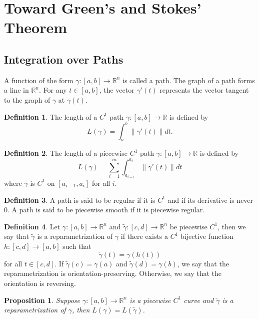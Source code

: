 \documentclass{article}
\theoremstyle{plain}
\newtheorem{proposition}[theorem]{Proposition}
\theoremstyle{definition}
\newtheorem*{definition}{Definition}
\newcommand{\R}{\mathbb{R}}
\newcommand{\norm}[1]{\left\lVert#1 \right\rVert}
\begin{document}
\section{Toward Green's and Stokes' Theorem}

\subsection{Integration over Paths}

A function of the form $\gamma : [a,b] \to \R^n$ is called a path. The graph of a path forms a line in $\R^n$. For any $t \in [a,b]$, the vector $\gamma'(t)$ represents the vector tangent to the graph of $\gamma$ at $\gamma(t)$.

\begin{definition}
    The length of a $C^1$ path $\gamma : [a,b] \to \R$ is defined by
    $$L(\gamma) = \int_{a}^{b}\norm{\gamma'(t)}dt.$$
\end{definition}

\begin{definition}
    The length of a piecewise $C^1$ path $\gamma : [a,b] \to \R$ is defined by
    $$L(\gamma) = \sum_{i=1}^{m}\int_{a_{i-1}}^{a_i}\norm{\gamma'(t)}dt$$
    where $\gamma$ is $C^1$ on $[a_{i-1}, a_i]$ for all $i$.
\end{definition}

\begin{definition}
    A path is said to be regular if it is $C^1$ and if its derivative is never 0. A path is said to be piecewise smooth if it is piecewise regular.
\end{definition}

\begin{definition}
    Let $\gamma : [a,b] \to \R^n$ and $\tilde\gamma : [c,d] \to \R^n$ be piecewise $C^1$, then we say that $\tilde\gamma$ is a reparametrization of $\gamma$ if there exists a $C^1$ bijective function $h : [c,d] \to [a,b]$ such that
    $$\tilde\gamma(t) = \gamma(h(t))$$
    for all $t \in [c,d]$. If $\tilde\gamma(c) = \gamma(a)$ and $\tilde\gamma(d) = \gamma(b)$, we say that the reparametrization is orientation-preserving. Otherwise, we say that the orientation is reversing.
\end{definition}

\begin{proposition}
    Suppose $\gamma : [a,b] \to \R^n$ is a piecewise $C^1$ curve and $\tilde\gamma$ is a reparametrization of $\gamma$, then $L(\gamma) = L(\tilde\gamma)$.
\end{proposition}
\end{document}
